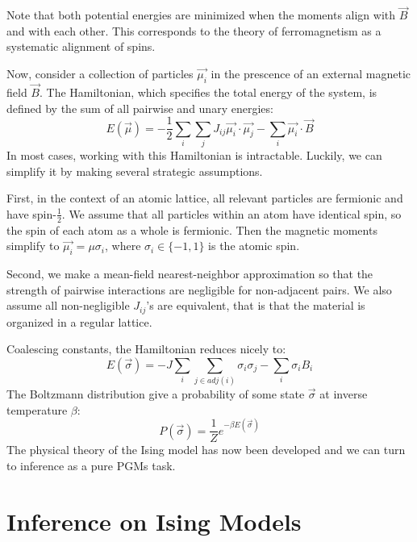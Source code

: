 \documentclass{article}
\begin{document}
Note that both potential energies are minimized when the moments align with 
$\vec{B}$ and with each other. 
This corresponds to the theory of ferromagnetism as a systematic alignment of 
spins. 

Now, consider a collection of particles $\vec{\mu_i}$ in the prescence of an 
external magnetic field $\vec{B}$. 
The Hamiltonian, which specifies the total energy of the system, is defined by 
the sum of all pairwise and unary energies:
\begin{equation}\label{exactE}
    E(\vec{\mu}) = -\frac{1}{2}\sum_i \sum_j J_{ij} \vec{\mu_i} \cdot \vec{\mu_j} - \sum_i \vec{\mu_i} \cdot \vec{B}
\end{equation}
In most cases, working with this Hamiltonian is intractable. 
Luckily, we can simplify it by making several strategic assumptions. 

First, in the context of an atomic lattice, all relevant particles are fermionic 
and have spin-$\frac{1}{2}$. 
We assume that all particles within an atom have identical spin, so the spin of 
each atom as a whole is fermionic. 
Then the magnetic moments simplify to $\vec{\mu_i} = \mu \sigma_i$, where 
$\sigma_i \in \{-1, 1\}$ is the atomic spin. 

Second, we make a mean-field nearest-neighbor approximation so that the strength 
of pairwise interactions are negligible for non-adjacent pairs. 
We also assume all non-negligible $J_{ij}$'s are equivalent, that is that the 
material is organized in a regular lattice. 

Coalescing constants, the Hamiltonian reduces nicely to:
\begin{equation}\label{isingE}
    E(\vec{\sigma}) = -J\sum_i \sum_{j \in adj(i)} \sigma_i \sigma_j - \sum_i \sigma_i B_i
\end{equation}
The Boltzmann distribution give a probability of some state $\vec{\sigma}$ at 
inverse temperature $\beta$:
\begin{equation} \label{boltzmann}
    P(\vec{\sigma}) = \frac{1}{Z}e^{-\beta E(\vec{\sigma})} 
\end{equation}
The physical theory of the Ising model has now been developed and we can turn to 
inference as a pure PGMs task. 










\section{Inference on Ising Models}
\end{document}
